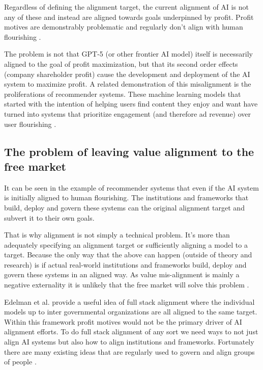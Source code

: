 Regardless of defining the alignment target, the current alignment of AI is not any of these and instead are aligned towards goals underpinned by profit. Profit motives are demonstrably problematic and regularly don't align with human flourishing \cite{stiglitzMarketsMarketFailures1989,UN_HRC_39_CRP2_2018}.

The problem is not that \textsc{GPT-5} (or other frontier AI model) itself is necessarily aligned to the goal of profit maximization, but that its second order effects (company shareholder profit) cause the development and deployment of the AI system to maximize profit. A related demonstration of this misalignment is the proliferations of recommender systems. These machine learning models that started with the intention of helping users find content they enjoy and want have turned into systems that prioritize engagement (and therefore ad revenue) over user flourishing \cite{milanoRecommenderSystemsTheir2020}.

\subsection{The problem of leaving value alignment to the free market}

It can be seen in the example of recommender systems that even if the AI system is initially aligned to human flourishing. The institutions and frameworks that build, deploy and govern these systems can  the original alignment target and subvert it to their own goals.

That is why alignment is not simply a technical problem. It's more than adequately specifying an alignment target or sufficiently aligning a model to a target. Because the only way that the above can happen (outside of theory and research) is if actual real-world institutions and frameworks build, deploy and govern these systems in an aligned way. As value mis-alignment is mainly a negative externality it is unlikely that the free market will solve this problem \cite{r.h.coarseProblemSocialCost}.

Edelman et al. \cite{edelmanFullStackAlignmentCoAligning2025} provide a useful idea of full stack alignment where the individual models up to inter governmental organizations are all aligned to the same target. Within this framework profit motives would not be the primary driver of AI alignment efforts. To do full stack alignment of any sort we need ways to not just align AI systems but also how to align institutions and frameworks. Fortunately there are many existing ideas that are regularly used to govern and align groups of people \cite{ostromGoverningCommonsEvolution1990,rawlsTheoryJusticeRevised1999}.

